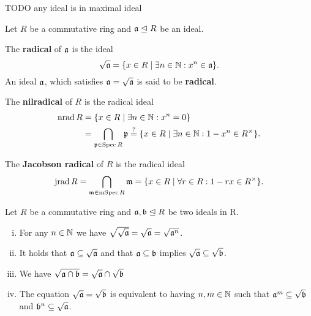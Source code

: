 	\begin{lemma}
		TODO any ideal is in maximal ideal
	\end{lemma}

	\begin{definition}
		Let $R$ be a commutative ring and $\mathfrak{a} \trianglelefteq R$ be an ideal. 

		The \textbf{radical} of $\mathfrak{a}$ is the ideal 
		\begin{equation*}
			\sqrt{\mathfrak{a}} = \{x \in R \mid \exists n \in \mathbb{N}: x^n \in \mathfrak{a}\}.
		\end{equation*}
		An ideal $\mathfrak{a}$, which satisfies $\mathfrak{a} = \sqrt{\mathfrak{a}}$ is said to be \textbf{radical}.

		The \textbf{nilradical} of $R$ is the radical ideal
		\begin{align*}
			\operatorname{nrad} R &= \{x \in R \mid \exists n \in \mathbb{N}: x^n = 0\} \\
			&= \bigcap \limits_{\mathfrak{p} \in \operatorname{Spec} R} \mathfrak{p} \overset{?}{=} \{x \in R \mid \exists n \in \mathbb{N}: 1 - x^n \in R^\times\}.
		\end{align*}

		The \textbf{Jacobson radical} of $R$ is the radical ideal
		\begin{equation*}
			\operatorname{jrad} R = \bigcap \limits_{\mathfrak{m} \in \operatorname{mSpec} R} \mathfrak{m} = \{x \in R \mid \forall r \in R: 1 - rx \in R^\times\}.
		\end{equation*}
	\end{definition}

	\begin{lemma}
		Let $R$ be a commutative ring and $\mathfrak{a},\mathfrak{b} \trianglelefteq R$ be two ideals in R.
		\begin{enumerate}[(i)]
			\item{
				For any $n \in \mathbb{N}$ we have $\sqrt{\sqrt{\mathfrak{a}}} = \sqrt{\mathfrak{a}} = \sqrt{\mathfrak{a}^n}$.
			}
			\item{
				It holds that $\mathfrak{a} \subseteq \sqrt{\mathfrak{a}}$ and that $\mathfrak{a} \subseteq \mathfrak{b}$ implies $\sqrt{\mathfrak{a}} \subseteq \sqrt{\mathfrak{b}}$.
			}
			\item{
				We have $\sqrt{\mathfrak{a} \cap \mathfrak{b}} = \sqrt{\mathfrak{a}} \cap \sqrt{\mathfrak{b}}$
			}
			\item{
				The equation $\sqrt{\mathfrak{a}} = \sqrt{\mathfrak{b}}$ is equivalent to having $n,m \in \mathbb{N}$ such that $\mathfrak{a}^m \subseteq \sqrt{\mathfrak{b}}$ and $\mathfrak{b}^n \subseteq \sqrt{\mathfrak{a}}$.
			}
		\end{enumerate}
	\end{lemma}

